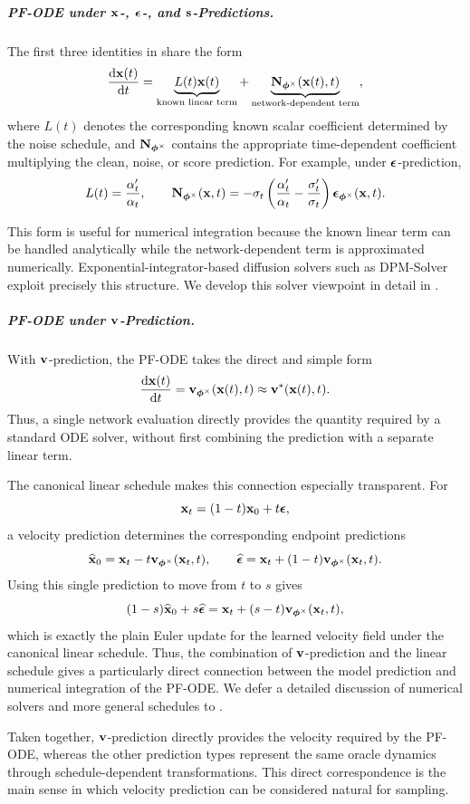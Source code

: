 \subparagraph{PF-ODE under ${\mathbf{x}}$-, ${\bm{\epsilon}}$-, and ${\mathbf{s}}$-Predictions.}
The first three identities in  share the form
\[
\frac{\mathop{}\!\mathrm{d}{\mathbf{x}}(t)}{\mathop{}\!\mathrm{d} t}
=
\underbrace{L(t){\mathbf{x}}(t)}_{\text{known linear term}}
+
\underbrace{{\mathbf{N}}_{\bm{\phi}^{\times}}({\mathbf{x}}(t),t)}_{\text{network-dependent term}},
\]
where $L(t)$ denotes the corresponding known scalar coefficient determined by
the noise schedule, and ${\mathbf{N}}_{\bm{\phi}^{\times}}$ contains the appropriate
time-dependent coefficient multiplying the clean, noise, or score prediction.
For example, under ${\bm{\epsilon}}$-prediction,
\[
L(t)
=
\frac{\alpha_t'}{\alpha_t},
\qquad
{\mathbf{N}}_{\bm{\phi}^{\times}}({\mathbf{x}},t)
=
-\sigma_t
\left(
\frac{\alpha_t'}{\alpha_t}
-
\frac{\sigma_t'}{\sigma_t}
\right)
{\bm{\epsilon}}_{\bm{\phi}^{\times}}({\mathbf{x}},t).
\]

This form is useful for numerical integration because the known linear term can
be handled analytically while the network-dependent term is approximated
numerically. Exponential-integrator-based diffusion solvers such as
DPM-Solver~\citep{lu2022dpm} exploit precisely this structure. We develop this
solver viewpoint in detail in .

\subparagraph{PF-ODE under ${\mathbf{v}}$-Prediction.}
With ${\mathbf{v}}$-prediction, the PF-ODE takes the direct and simple form
\[
\frac{\mathop{}\!\mathrm{d}{\mathbf{x}}(t)}{\mathop{}\!\mathrm{d} t}
=
{\mathbf{v}}_{\bm{\phi}^{\times}}({\mathbf{x}}(t),t)
\approx
{\mathbf{v}}^*({\mathbf{x}}(t),t).
\]
Thus, a single network evaluation directly provides the quantity required by
a standard ODE solver, without first combining the prediction with a separate
linear term.

The canonical linear schedule makes this connection especially transparent.
For
\[
{\mathbf{x}}_t=(1-t){\mathbf{x}}_0+t{\bm{\epsilon}},
\]
a velocity prediction determines the corresponding endpoint predictions
\[
\widehat{{\mathbf{x}}}_0
=
{\mathbf{x}}_t-t{\mathbf{v}}_{\bm{\phi}^{\times}}({\mathbf{x}}_t,t),
\qquad
\widehat{{\bm{\epsilon}}}
=
{\mathbf{x}}_t+(1-t){\mathbf{v}}_{\bm{\phi}^{\times}}({\mathbf{x}}_t,t).
\]
Using this single prediction to move from $t$ to $s$ gives
\[
(1-s)\widehat{{\mathbf{x}}}_0+s\widehat{{\bm{\epsilon}}}
=
{\mathbf{x}}_t
+
(s-t){\mathbf{v}}_{\bm{\phi}^{\times}}({\mathbf{x}}_t,t),
\]
which is exactly the plain Euler update for the learned velocity field under
the canonical linear schedule. Thus, the combination of ${\mathbf{v}}$-prediction and
the linear schedule gives a particularly direct connection between the model
prediction and numerical integration of the PF-ODE. We defer a detailed
discussion of numerical solvers and more general schedules to
.

Taken together, ${\mathbf{v}}$-prediction directly provides the velocity required by
the PF-ODE, whereas the other prediction types represent the same oracle
dynamics through schedule-dependent transformations. This direct
correspondence is the main sense in which velocity prediction can be
considered natural for sampling.




